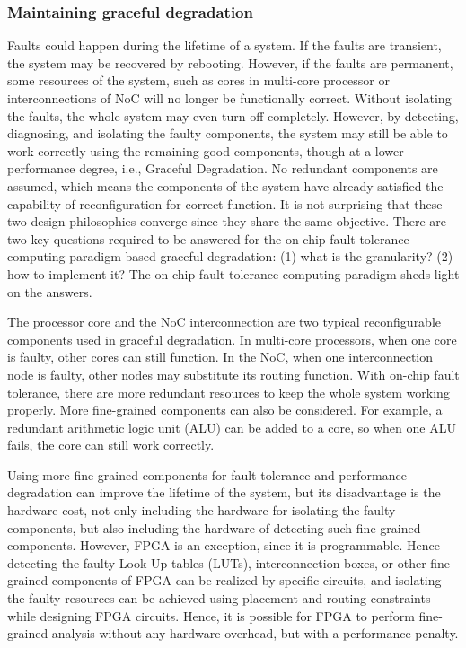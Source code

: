 \subsubsection{Maintaining graceful degradation}
Faults could happen during the lifetime of a system. If the faults are transient, the system may be recovered by rebooting. However, if the faults are permanent, some resources of the system, such as cores in multi-core processor or interconnections of NoC will no longer be functionally correct. Without isolating the faults, the whole system may even turn off completely. However, by detecting, diagnosing, and isolating the faulty components, the system may still be able to work correctly using the remaining good components, though at a lower performance degree, i.e., Graceful Degradation. No redundant components are assumed, which means the components of the system have already satisfied the capability of reconfiguration for correct function. It is not surprising that these two design philosophies converge since they share the same objective. There are two key questions required to be answered for the on-chip fault tolerance computing paradigm based graceful degradation: (1) what is the granularity? (2) how to implement it? The on-chip fault tolerance computing paradigm sheds light on the answers.

The processor core and the NoC interconnection are two typical reconfigurable components used in graceful degradation. In multi-core processors, when one core is faulty, other cores can still function. In the NoC, when one interconnection node is faulty, other nodes may substitute its routing function. With on-chip fault tolerance, there are more redundant resources to keep the whole system working properly. More fine-grained components can also be considered. For example, a redundant arithmetic logic unit (ALU) can be added to a core, so when one ALU fails, the core can still work correctly.

Using more fine-grained components for fault tolerance and performance degradation can improve the lifetime of the system, but its disadvantage is the hardware cost, not only including the hardware for isolating the faulty components, but also including the hardware of detecting such fine-grained components. However, FPGA is an exception, since it is programmable. Hence detecting the faulty Look-Up tables (LUTs), interconnection boxes, or other fine-grained components of FPGA can be realized by specific circuits, and isolating the faulty resources can be achieved using placement and routing constraints while designing FPGA circuits. Hence, it is possible for FPGA to perform fine-grained analysis without any hardware overhead, but with a performance penalty.

